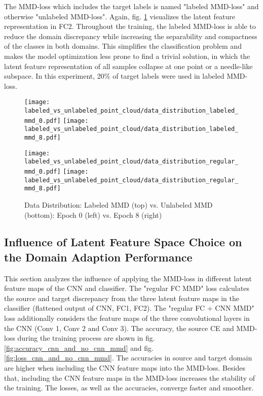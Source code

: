  The MMD-loss which includes the target labels is named "labeled MMD-loss" and otherwise "unlabeled MMD-loss". Again, fig. \ref{fig:point_cloud_labeled_unlabeled_mmd} visualizes the latent feature representation in FC2. Throughout the training, the labeled MMD-loss is able to reduce the domain discrepancy while increasing the separability and compactness of the classes in both domains. This simplifies the classification problem and makes the model optimization less prone to find a trivial solution, in which the latent feature representation of all samples collapse at one point or a needle-like subspace. In this experiment, 20\% of target labels were used in labeled MMD-loss.
\begin{figure}[htp]
  \centering
  \texttt{[image: labeled\_vs\_unlabeled\_point\_cloud/data\_distribution\_labeled\_mmd\_0.pdf]}
  \hspace{.4cm}
  \texttt{[image: labeled\_vs\_unlabeled\_point\_cloud/data\_distribution\_labeled\_mmd\_8.pdf]}

  \vspace{.1cm}

  \texttt{[image: labeled\_vs\_unlabeled\_point\_cloud/data\_distribution\_regular\_mmd\_0.pdf]}
  \hspace{.4cm}
  \texttt{[image: labeled\_vs\_unlabeled\_point\_cloud/data\_distribution\_regular\_mmd\_8.pdf]}
  
  \caption{Data Distribution: Labeled MMD (top) vs. Unlabeled MMD (bottom): Epoch 0 (left) vs. Epoch 8 (right)}
  \label{fig:point_cloud_labeled_unlabeled_mmd}
\end{figure}

\subsection{Influence of Latent Feature Space Choice on the Domain Adaption Performance}
\label{cnn_mmd_dummy}
This section analyzes the influence of applying the MMD-loss in different latent feature maps of the CNN and classifier. The "regular FC MMD" loss calculates the source and target discrepancy from the three latent feature maps in the classifier (flattened output of CNN, FC1, FC2). The "regular FC + CNN MMD" loss additionally considers the feature maps of the three convolutional layers in the CNN (Conv 1, Conv 2 and Conv 3). The accuracy, the source CE and MMD-loss during the training process are shown in fig. \ref{fig:accuracy_cnn_and_no_cnn_mmd} and fig. \ref{fig:loss_cnn_and_no_cnn_mmd}. The accuracies in source and target domain are higher when including the CNN feature maps into the MMD-loss. Besides that, including the CNN feature maps in the MMD-loss increases the stability of the training. The losses, as well as the accuracies, converge faster and smoother.

